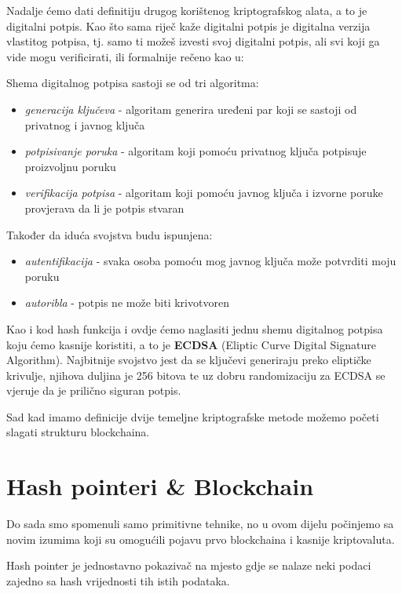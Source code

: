 \documentclass[12pt]{report}
\begin{document}
Nadalje ćemo dati definitiju drugog korištenog kriptografskog alata, a to je digitalni potpis. Kao što sama riječ kaže digitalni potpis je digitalna verzija vlastitog potpisa, tj. samo ti možeš izvesti svoj digitalni potpis, ali svi koji ga vide mogu verificirati, ili formalnije rečeno kao u\cite{bitcoincrypto}:

\begin{definicija}
Shema digitalnog potpisa sastoji se od tri algoritma: 
\begin{itemize}
    \item \textit{generacija ključeva} - algoritam generira uređeni par koji se sastoji od privatnog i javnog ključa
    \item \textit{potpisivanje poruka} - algoritam koji pomoću privatnog ključa potpisuje proizvoljnu poruku
    \item \textit{verifikacija potpisa} - algoritam koji pomoću javnog ključa i izvorne poruke provjerava da li je potpis stvaran
\end{itemize}
Također da iduća svojstva budu ispunjena:
\begin{itemize}
    \item \textit{autentifikacija} - svaka osoba pomoću mog javnog ključa može potvrditi moju poruku
    \item \textit{autoribla} - potpis ne može biti krivotvoren
\end{itemize}
\end{definicija}

Kao i kod hash funkcija i ovdje ćemo naglasiti jednu shemu digitalnog potpisa koju ćemo kasnije koristiti, a to je \textbf{ECDSA} (Eliptic Curve Digital Signature Algorithm). Najbitnije svojstvo jest da se ključevi generiraju preko eliptičke krivulje, njihova duljina je 256 bitova te uz dobru randomizaciju za ECDSA se vjeruje da je prilično siguran potpis.

Sad kad imamo definicije dvije temeljne kriptografske metode možemo početi slagati strukturu blockchaina.

\section{Hash pointeri \& Blockchain}

Do sada smo spomenuli samo primitivne tehnike, no u ovom dijelu počinjemo sa novim izumima koji su omogućili pojavu prvo blockchaina i kasnije kriptovaluta. 

\begin{definicija}
Hash pointer je jednostavno pokazivač na mjesto gdje se nalaze neki podaci zajedno sa hash vrijednosti tih istih podataka.
\end{definicija}
\end{document}
